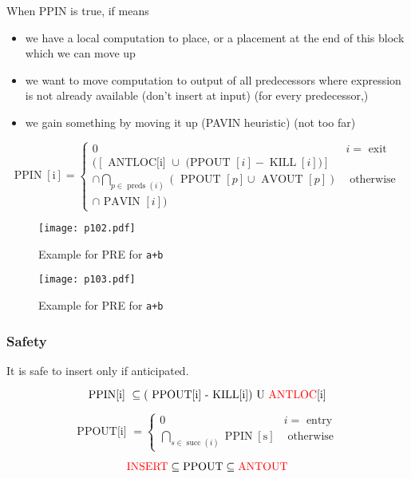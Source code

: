 When PPIN is true, if means 
\begin{itemize}
\item we have a local computation to place, or a placement at the end of this block which we can move up 
\item  we want to move computation to output of all predecessors where expression is not already available (don’t insert at input) (for every predecessor,)
\item we gain something by moving it up (PAVIN heuristic) (not too far)
\end{itemize}

$$
\operatorname{PPIN}[\mathrm{i}]=\left\{\begin{array}{cc}
0 & i=\text { exit } \\
([\text { ANTLOC[i] } \cup \text { (PPOUT }[i]-\operatorname{KILL}[i])] & \\
\cap \bigcap_{p \in \text { preds }(i)}(\text { PPOUT }[p] \cup \text { AVOUT }[p]) & \text { otherwise } \\
\cap \text { PAVIN }[i]) &
\end{array}\right.
$$




\begin{figure}[H]
    \centering
     \texttt{[image: p102.pdf]}
         \caption{Example for PRE for \texttt{a+b}}
         \label{fig:p102}
\end{figure}

\begin{figure}[H]
    \centering
     \texttt{[image: p103.pdf]}
         \caption{Example for PRE for \texttt{a+b}}
         \label{fig:p103}
\end{figure}
\subsubsection{Safety}

It is  safe to insert only if anticipated. 

$$
\text { PPIN[i] } \subseteq(\text { PPOUT[i] - KILL[i]) U {\color{red}ANTLOC}[i] }
$$


$$
\text { PPOUT[i] }=\left\{\begin{array}{cl}
0 & i=\text { entry } \\
\bigcap_{s \in \operatorname{succ}(i)} \operatorname{PPIN}[\mathrm{s}] & \text { otherwise }
\end{array}\right.
$$

$$
{\color{red}\text{INSERT}} \subseteq \text{PPOUT} \subseteq {\color{red}\text{ANTOUT}}
$$

